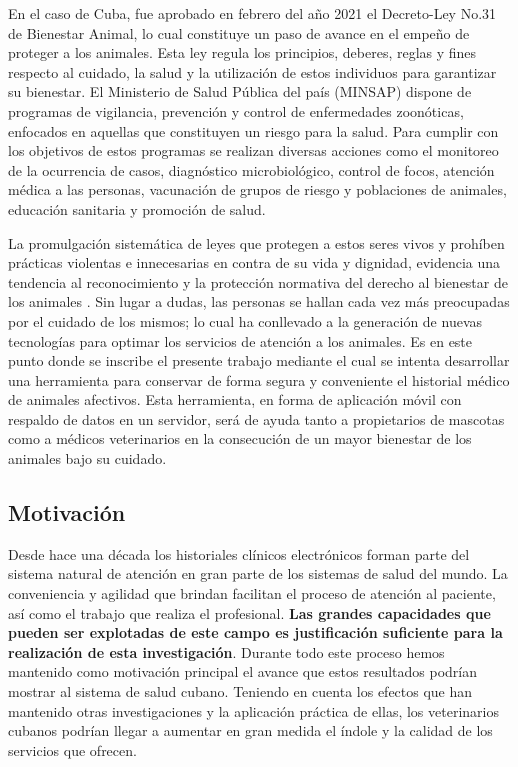 En el caso de Cuba, fue aprobado en febrero del año 2021 el Decreto-Ley No.31 de Bienestar Animal, lo cual constituye un paso de avance en el empeño de proteger a los animales. Esta ley regula los principios, deberes, reglas y fines respecto al cuidado, la salud y la utilización de estos individuos para garantizar su bienestar. El Ministerio de Salud Pública del país (MINSAP) dispone de programas de vigilancia, prevención y control de enfermedades zoonóticas, enfocados en aquellas que constituyen un riesgo para la salud. Para cumplir con los objetivos de estos programas se realizan diversas acciones como el monitoreo de la ocurrencia de casos, diagnóstico microbiológico, control de focos, atención médica a las personas, vacunación de grupos de riesgo y poblaciones de animales, educación sanitaria y promoción de salud. 



La promulgación sistemática de leyes que protegen a estos seres vivos y prohíben prácticas violentas e innecesarias en contra de su vida y dignidad, evidencia una tendencia al reconocimiento y la protección normativa del derecho al bienestar de los animales . Sin lugar a dudas, las personas se hallan cada vez más preocupadas por el cuidado de los mismos; lo cual ha conllevado a la generación de nuevas tecnologías para optimar los servicios de atención a los animales. Es en este punto donde se inscribe el presente trabajo mediante el cual se intenta desarrollar una herramienta para conservar de forma segura y conveniente el historial médico de animales afectivos. Esta herramienta, en forma de aplicación móvil con respaldo de datos en un servidor, será de ayuda tanto a propietarios de mascotas como a médicos veterinarios en la consecución de un mayor bienestar de los animales bajo su cuidado. 


\subsection*{Motivaci\'on}

Desde hace una d\'ecada los historiales clínicos electr\'onicos forman parte del sistema natural de atenci\'on en gran parte de los sistemas de salud del mundo. La conveniencia y agilidad que brindan facilitan el proceso de atenci\'on al paciente, as\'i como el trabajo que realiza el profesional. \textbf{Las grandes capacidades que pueden ser explotadas de este campo es justificaci\'on suficiente para la realizaci\'on de esta investigaci\'on}. Durante todo este proceso hemos mantenido como motivaci\'on principal el avance que estos resultados podr\'ian mostrar al sistema de salud cubano. Teniendo en cuenta los efectos que han mantenido otras investigaciones y la aplicaci\'on pr\'actica de ellas, los veterinarios cubanos podr\'ian llegar a aumentar en gran medida el \'indole y la calidad de los servicios que ofrecen.

